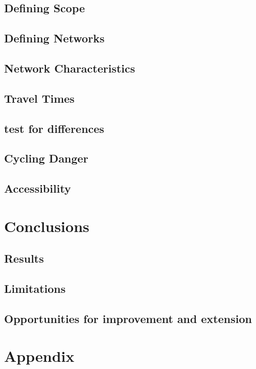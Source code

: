 \documentclass[11pt]{article} %
\begin{document}
\subsection{Defining Scope}

\subsection{Defining Networks}

\subsection{Network Characteristics}

\subsection{Travel Times}

\subsection{test for differences}

\subsection{Cycling Danger}

\subsection{Accessibility}

\section{Conclusions}

\subsection{Results}

\subsection{Limitations}

\subsection{Opportunities for improvement and extension}

\section{Appendix}

\pagebreak
\printbibliography
\end{document}
